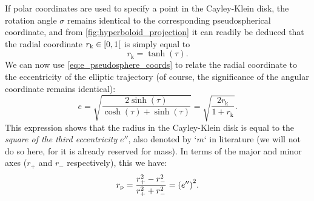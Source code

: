 If polar coordinates are used to specify a point in the Cayley-Klein disk, the rotation angle $\sigma$ remains identical to the corresponding pseudospherical coordinate, and from \cref{fig:hyperboloid_projection} it can readily be deduced that the radial coordinate $r_\text{k} \in \interval[open right]{0}{1}$ is simply equal to
\begin{equation}
    r_\text{k} = \tanh(\tau).
\end{equation}
We can now use \cref{eq:e_pseudosphere_coords} to relate the radial coordinate to the eccentricity of the elliptic trajectory (of course, the significance of the angular coordinate remains identical):
\begin{equation}
    e = \sqrt{\frac{2\sinh(\tau)}{\cosh(\tau) + \sinh(\tau)}} = \sqrt{\frac{2r_\text{k}}{1 + r_\text{k}}}. 
\end{equation}
This expression shows that the radius in the Cayley-Klein disk is equal to the \emph{square of the third eccentricity} $e''$, also denoted by `$m$` in literature (we will not do so here, for it is already reserved for mass). In terms of the major and minor axes ($r_+$ and $r_-$ respectively), this we have: \cite{Rapp1991}
\begin{equation}
    r_\text{p} = \frac{r_+^2 - r_-^2}{r_+^2 + r_-^2} = \qty(e'')^2.
    \label{eq:eccentricity_cayley}
\end{equation}

